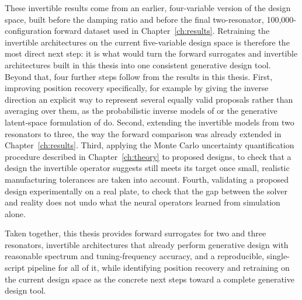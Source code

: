 These invertible results come from an earlier, four-variable version of the design space, built before the damping ratio and before the final two-resonator, 100{,}000-configuration forward dataset used in Chapter~\ref{ch:results}. Retraining the invertible architectures on the current five-variable design space is therefore the most direct next step: it is what would turn the forward surrogates and invertible architectures built in this thesis into one consistent generative design tool. Beyond that, four further steps follow from the results in this thesis. First, improving position recovery specifically, for example by giving the inverse direction an explicit way to represent several equally valid proposals rather than averaging over them, as the probabilistic inverse models of \textcite{thorpe2025generalizable} or the generative latent-space formulation of \textcite{zang2026designgenno} do. Second, extending the invertible models from two resonators to three, the way the forward comparison was already extended in Chapter~\ref{ch:results}. Third, applying the Monte Carlo uncertainty quantification procedure described in Chapter~\ref{ch:theory} to proposed designs, to check that a design the invertible operator suggests still meets its target once small, realistic manufacturing tolerances are taken into account. Fourth, validating a proposed design experimentally on a real plate, to check that the gap between the solver and reality does not undo what the neural operators learned from simulation alone.

Taken together, this thesis provides forward surrogates for two and three resonators, invertible architectures that already perform generative design with reasonable spectrum and tuning-frequency accuracy, and a reproducible, single-script pipeline for all of it, while identifying position recovery and retraining on the current design space as the concrete next steps toward a complete generative design tool.
